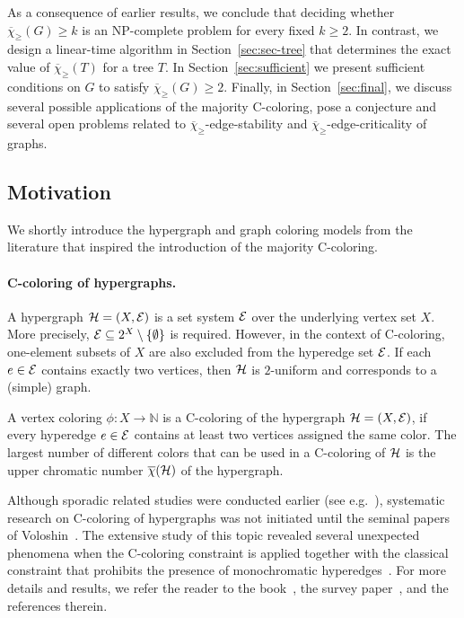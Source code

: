 \documentclass{article}
\theoremstyle{definition}
\newcommand{\mc}{\overline{\chi}_{\geqslant}}
\newcommand{\cH}{{\cal H}}
\newcommand{\cE}{{\cal E}}
\begin{document}
    As a consequence of earlier results, we conclude that deciding whether $\mc(G) \ge k$ is an NP-complete problem for every fixed $k \ge 2$. In contrast, we design a linear-time algorithm in Section~\ref{sec:sec-tree} that determines the exact value of $\mc(T)$ for a tree $T$. In Section~\ref{sec:sufficient} we present sufficient conditions on $G$ to satisfy $\mc(G) \ge 2$.  Finally, in Section~\ref{sec:final}, we discuss several possible applications of the majority C-coloring, pose a conjecture and several open problems related to $\mc$-edge-stability and  $\mc$-edge-criticality of graphs.
    



\subsection{Motivation} \label{subsec:motivation}
We shortly introduce the hypergraph and graph coloring models from the literature that inspired the introduction of the majority C-coloring.

\paragraph{C-coloring of hypergraphs.} A hypergraph $\cH=(X,\cE)$ is a set system  $\cE$ over the underlying vertex set $X$. More precisely,  $\cE \subseteq 2^X \setminus \{\emptyset\}$ is required. However, in the context of C-coloring, one-element subsets of $X$ are also excluded from the hyperedge set $\cE$. If each $e \in \cE$ contains exactly two vertices, then $\cH$ is $2$-uniform and corresponds to a (simple) graph. 

A vertex coloring $\phi \colon  X \rightarrow \mathbb{N}$ is a C-coloring of the hypergraph $\cH=(X, \cE)$, if every hyperedge $e \in \cE$ contains at least two vertices assigned the same color. The largest number of different colors that can be used in a C-coloring of $\cH$ is the upper chromatic number $\overline{\chi}(\cH)$ of the hypergraph. 

Although sporadic related studies were conducted earlier (see e.g.~\cite{Arocha, Sterboul}), systematic research on C-coloring of hypergraphs was not initiated until the seminal papers of Voloshin~\cite{Vol-1993, Vol-1995}. The extensive study of this topic revealed several unexpected phenomena when the C-coloring constraint is applied together with the classical constraint that prohibits the presence of monochromatic hyperedges~\cite{Bacso, Blazsik, Bujtas-2009, Jiang-2002, Kundgen}. For more details and results, we refer the reader to the book~\cite{Vol-2002}, the survey paper~\cite{BuTu-2010}, and the references therein.
\end{document}
